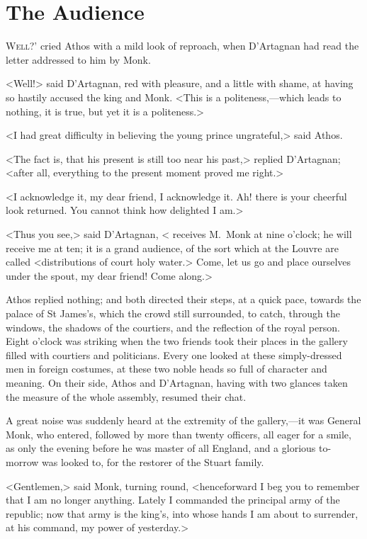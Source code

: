 \chapter{The Audience}

\lettrine[ante=`]{W}{ell?}' cried Athos with a mild look of reproach, when D'Artagnan had read the letter addressed to him by Monk.

\zz
<Well!> said D'Artagnan, red with pleasure, and a little with shame, at having so hastily accused the king and Monk. <This is a politeness,—which leads to nothing, it is true, but yet it is a politeness.>

<I had great difficulty in believing the young prince ungrateful,> said Athos.

<The fact is, that his present is still too near his past,> replied D'Artagnan; <after all, everything to the present moment proved me right.>

<I acknowledge it, my dear friend, I acknowledge it. Ah! there is your cheerful look returned. You cannot think how delighted I am.>

<Thus you see,> said D'Artagnan, < receives M.~Monk at nine o'clock; he will receive me at ten; it is a grand audience, of the sort which at the Louvre are called <distributions of court holy water.> Come, let us go and place ourselves under the spout, my dear friend! Come along.>

Athos replied nothing; and both directed their steps, at a quick pace, towards the palace of St James's, which the crowd still surrounded, to catch, through the windows, the shadows of the courtiers, and the reflection of the royal person. Eight o'clock was striking when the two friends took their places in the gallery filled with courtiers and politicians. Every one looked at these simply-dressed men in foreign costumes, at these two noble heads so full of character and meaning. On their side, Athos and D'Artagnan, having with two glances taken the measure of the whole assembly, resumed their chat.

A great noise was suddenly heard at the extremity of the gallery,—it was General Monk, who entered, followed by more than twenty officers, all eager for a smile, as only the evening before he was master of all England, and a glorious to-morrow was looked to, for the restorer of the Stuart family.

<Gentlemen,> said Monk, turning round, <henceforward I beg you to remember that I am no longer anything. Lately I commanded the principal army of the republic; now that army is the king's, into whose hands I am about to surrender, at his command, my power of yesterday.>

